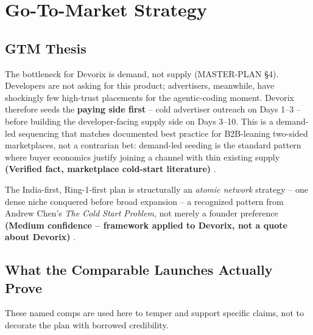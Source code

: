 \chapter{Go-To-Market Strategy}
\label{chap:gtm}

\section{GTM Thesis}
\label{sec:gtm-overview}

The bottleneck for Devorix is demand, not supply (MASTER-PLAN \S4). Developers are not asking for this product; advertisers, meanwhile, have shockingly few high-trust placements for the agentic-coding moment. Devorix therefore seeds the \textbf{paying side first} -- cold advertiser outreach on Days 1--3 -- before building the developer-facing supply side on Days 3--10. This is a demand-led sequencing that matches documented best practice for B2B-leaning two-sided marketplaces, not a contrarian bet: demand-led seeding is the standard pattern where buyer economics justify joining a channel with thin existing supply \textbf{(Verified fact, marketplace cold-start literature)} \cite{internetmango_coldstart}.

The India-first, Ring-1-first plan is structurally an \emph{atomic network} strategy -- one dense niche conquered before broad expansion -- a recognized pattern from Andrew Chen's \textit{The Cold Start Problem}, not merely a founder preference \textbf{(Medium confidence -- framework applied to Devorix, not a quote about Devorix)} \cite{chen_coldstart_2021}.

\section{What the Comparable Launches Actually Prove}
\label{sec:gtm-comps}

These named comps are used here to temper and support specific claims, not to decorate the plan with borrowed credibility.

